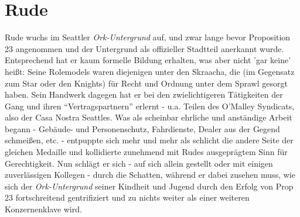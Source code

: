 \section{Rude}
Rude wuchs im Seattler \textit{Ork-Untergrund} auf, und zwar lange bevor Proposition 23 angenommen und der Untergrund als offizieller Stadtteil anerkannt wurde. Entsprechend hat er kaum formelle Bildung erhalten, was aber nicht 'gar keine' heißt: Seine Rolemodels waren diejenigen unter den Skraacha, die (im Gegensatz zum Star oder den Knights) für Recht und Ordnung unter dem Sprawl gesorgt haben. Sein Handwerk dagegen hat er bei den zwielichtigeren Tätigkeiten der Gang und ihren ``Vertragspartnern'' erlernt - u.a. Teilen des O'Malley Syndicats, also der Casa Nostra Seattles. Was als scheinbar ehrliche und anständige Arbeit begann - Gebäude- und Personenschutz, Fahrdienste, Dealer aus der Gegend schmeißen, etc. - entpuppte sich mehr und mehr als schlicht die andere Seite der gleichen Medaille und kollidierte zunehmend mit Rudes ausgeprägtem Sinn für Gerechtigkeit. Nun schlägt er sich - auf sich allein gestellt oder mit einigen zuverlässigen Kollegen - durch die Schatten, während er dabei zusehen muss, wie sich der \textit{Ork-Untergrund} seiner Kindheit und Jugend durch den Erfolg von Prop 23 fortschreitend gentrifiziert und zu nichts weiter als einer weiteren Konzernenklave wird.



